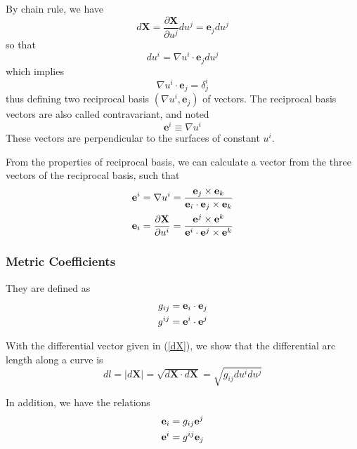 By chain rule, we have 
\begin{equation}
d\mathbf{X=}\frac{\partial\mathbf{X}}{\partial u^{j}}du^{j}=\mathbf{e}%
_{j}du^{j}  \label{dX}
\end{equation}
so that 
\begin{equation}
du^{i}=\nabla u^{i}\cdot\mathbf{e}_{j}du^{j}
\end{equation}
which implies 
\begin{equation}
\nabla u^{i}\cdot\mathbf{e}_{j}=\delta_{j}^{i}
\end{equation}
thus defining two reciprocal basis $\left( \nabla u^{i},\mathbf{e}%
_{j}\right) $ of vectors. The reciprocal basis vectors are also called
contravariant, and noted 
\begin{equation}
\mathbf{e}^{i}\equiv\nabla u^{i}  \label{cont}
\end{equation}
These vectors are perpendicular to the surfaces of constant $u^{i}$.

From the properties of reciprocal basis, we can calculate a vector from the
three vectors of the reciprocal basis, such that 
\begin{align}
\mathbf{e}^{i} & =\nabla u^{i}=\frac{\mathbf{e}_{j}\times\mathbf{e}_{k}}{%
\mathbf{e} _{i}\cdot\mathbf{e}_{j}\times\mathbf{e}_{k}}  \label{rel1} \\
\mathbf{e}_{i} & =\frac{\partial\mathbf{X}}{\partial u^{i}}=\frac{\mathbf{e}
^{j}\times\mathbf{e}^{k}}{\mathbf{e}^{i}\cdot\mathbf{e}^{j}\times \mathbf{e}%
^{k}}  \label{rel2}
\end{align}

\subsubsection{Metric Coefficients}

They are defined as 
\begin{align}
g_{ij} & =\mathbf{e}_{i}\cdot\mathbf{e}_{j}  \label{met} \\
g^{ij} & =\mathbf{e}^{i}\cdot\mathbf{e}^{j}  \notag
\end{align}

With the differential vector given in (\ref{dX}), we show that the
differential arc length along a curve is 
\begin{equation}
dl=\left| d\mathbf{X}\right| \mathbf{=}\sqrt{d\mathbf{X\cdot} d\mathbf{X}}=%
\sqrt{ g_{ij}du^{i}du^{j}}  \label{dl}
\end{equation}

In addition, we have the relations 
\begin{align}
\mathbf{e}_{i} & =g_{ij}\mathbf{e}^{j}  \label{corr} \\
\mathbf{e}^{i} & =g^{ij}\mathbf{e}_{j}  \notag
\end{align}

